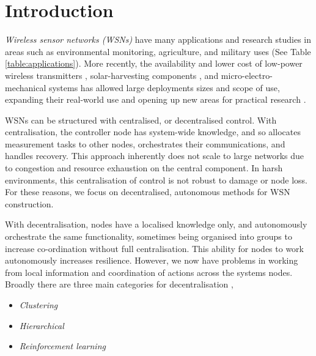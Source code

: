 \section{Introduction}

\textit{Wireless sensor networks (WSNs)} have many applications and research studies in areas such as environmental monitoring, agriculture, and military uses (See Table \ref{table:applications}). More recently, the availability and lower cost of low-power wireless transmitters \citep{902661}, solar-harvesting components \citep{Prauzek2018}, and micro-electro-mechanical systems \citep{1045391} has allowed large deployments sizes and scope of use, expanding their real-world use and opening up new areas for practical research \citep{5597912, Kandris2020}.

WSNs can be structured with centralised, or decentralised control. With centralisation, the controller node has system-wide knowledge, and so allocates measurement tasks to other nodes, orchestrates their communications, and handles recovery. This approach inherently does not scale to large networks due to congestion and resource exhaustion on the central component. In harsh environments, this centralisation of control is not robust to damage or node loss. For these reasons, we focus on decentralised, autonomous methods for WSN construction.

With decentralisation, nodes have a localised knowledge only, and autonomously orchestrate the same functionality, sometimes being organised into groups to increase co-ordination without full centralisation. This ability for nodes to work autonomously increases resilience. However, we now have problems in working from local information and coordination of actions across the systems nodes. Broadly there are three main categories for decentralisation \citep{10.1007/978-3-642-11814-2_4, 10.1504/IJCNDS.2012.048871},
\begin{itemize}
	\item \textit{Clustering}
	\item \textit{Hierarchical}
	\item \textit{Reinforcement learning}
\end{itemize}

